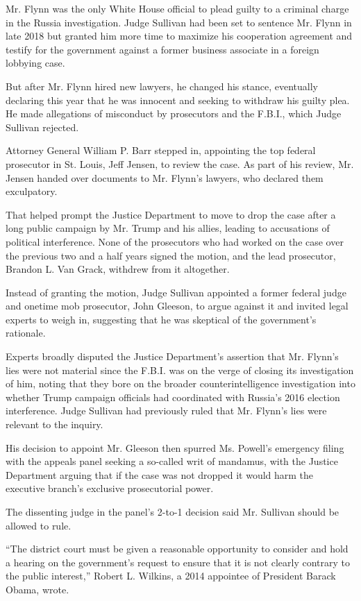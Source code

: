 Mr. Flynn was the only White House official to plead guilty to a
criminal charge in the Russia investigation. Judge Sullivan had been set
to sentence Mr. Flynn in late 2018 but granted him more time to maximize
his cooperation agreement and testify for the government against a
former business associate in a foreign lobbying case.

But after Mr. Flynn hired new lawyers, he changed his stance, eventually
declaring this year that he was innocent and seeking to withdraw his
guilty plea. He made allegations of misconduct by prosecutors and the
F.B.I., which Judge Sullivan rejected.

Attorney General William P. Barr stepped in, appointing the top federal
prosecutor in St. Louis, Jeff Jensen, to review the case. As part of his
review, Mr. Jensen handed over documents to Mr. Flynn's lawyers, who
declared them exculpatory.

That helped prompt the Justice Department to move to drop the case after
a long public campaign by Mr. Trump and his allies, leading to
accusations of political interference. None of the prosecutors who had
worked on the case over the previous two and a half years signed the
motion, and the lead prosecutor, Brandon L. Van Grack, withdrew from it
altogether.

Instead of granting the motion, Judge Sullivan appointed a former
federal judge and onetime mob prosecutor, John Gleeson, to argue against
it and invited legal experts to weigh in, suggesting that he was
skeptical of the government's rationale.

Experts broadly disputed the Justice Department's assertion that Mr.
Flynn's lies were not material since the F.B.I. was on the verge of
closing its investigation of him, noting that they bore on the broader
counterintelligence investigation into whether Trump campaign officials
had coordinated with Russia's 2016 election interference. Judge Sullivan
had previously ruled that Mr. Flynn's lies were relevant to the inquiry.

His decision to appoint Mr. Gleeson then spurred Ms. Powell's emergency
filing with the appeals panel seeking a so-called writ of mandamus, with
the Justice Department arguing that if the case was not dropped it would
harm the executive branch's exclusive prosecutorial power.

The dissenting judge in the panel's 2-to-1 decision said Mr. Sullivan
should be allowed to rule.

``The district court must be given a reasonable opportunity to consider
and hold a hearing on the government's request to ensure that it is not
clearly contrary to the public interest,'' Robert L. Wilkins, a 2014
appointee of President Barack Obama, wrote.

